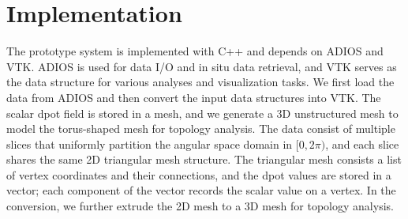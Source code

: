 \section{Implementation}
\label{sec:impl}

The prototype system is implemented with C++ and depends on ADIOS and VTK.  ADIOS is used for data I/O and in situ data retrieval, and VTK serves as the data structure for various analyses and visualization tasks.  We first load the data from ADIOS and then convert the input data structures into VTK.  The scalar dpot field is stored in a mesh, and we generate a 3D unstructured mesh to model the torus-shaped mesh for topology analysis.  The data consist of multiple slices that uniformly partition the angular space domain in $[0, 2\pi)$, and each slice shares the same 2D triangular mesh structure.  The triangular mesh consists a list of vertex coordinates and their connections, and the dpot values are stored in a vector; each component of the vector records the scalar value on a vertex.  In the conversion, we further extrude the 2D mesh to a 3D mesh for topology analysis.  
